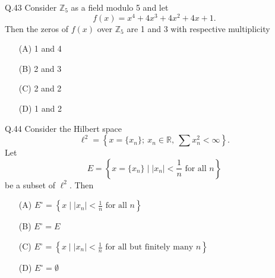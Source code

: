 \documentclass{article}
\begin{document}
																																																Q.43 \quad Consider $\mathbb{Z}_5$ as a field modulo 5 and let
																																																    \[
																																																        f(x) = x^4 + 4x^3 + 4x^2 + 4x + 1.
																																																	    \]
																																																	        Then the zeros of $f(x)$ over $\mathbb{Z}_5$ are 1 and 3 with respective multiplicity
																																																		    \begin{itemize}
																																																		            
																																																			            \item[(A)] 1 and 4
																																																				            \item[(B)] 2 and 3
																																																					            \item[(C)] 2 and 2
																																																						            \item[(D)] 1 and 2
																																																							        \end{itemize}
																																																								 \vspace{0.5em}
																																																								 Q.44 \quad Consider the Hilbert space
																																																								     \[
																																																								         \ell^2 = \left\{ x = \{x_n\};\ x_n \in \mathbb{R},\ \sum x_n^2 < \infty \right\}.
																																																									     \]
																																																									         Let
																																																										     \[
																																																										         E = \left\{ x = \{x_n\} \mid |x_n| < \frac{1}{n} \text{ for all } n \right\}
																																																											     \]
																																																											         be a subset of $\ell^2$. Then
																																																												     \begin{itemize}
																																																												             
																																																													             \item[(A)] $E^\circ = \left\{ x \mid |x_n| < \frac{1}{n} \text{ for all } n \right\}$
																																																														             \item[(B)] $E^\circ = E$
																																																															             \item[(C)] $E^\circ = \left\{ x \mid |x_n| < \frac{1}{n} \text{ for all but finitely many } n \right\}$
																																																																             \item[(D)] $E^\circ = \emptyset$
																																																																	         \end{itemize}
																																																																		     
\end{document}
